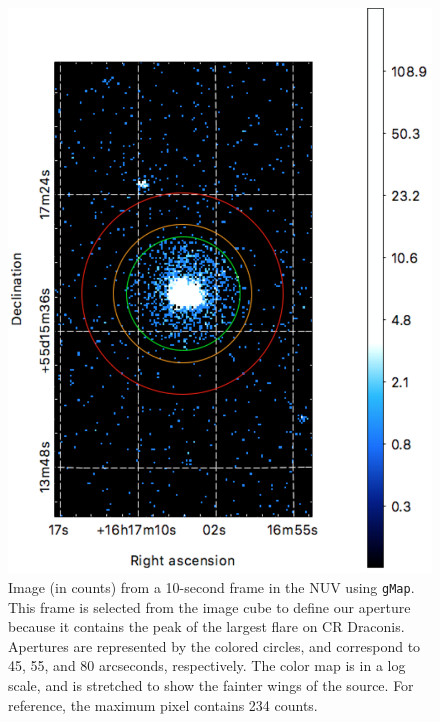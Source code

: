 \documentclass[iop]{emulateapj}
\begin{document}
\begin{figure}[h]
\includegraphics[scale=0.65]{Fig12.pdf}
\caption{Image (in counts) from a 10-second frame in the NUV using \texttt{gMap}.  This frame is selected from the image cube to define our aperture because it contains the peak of the largest flare on CR Draconis.  Apertures are represented by the colored circles, and correspond to 45, 55, and 80 arcseconds, respectively.  The color map is in a log scale, and is stretched to show the fainter wings of the source.  For reference, the maximum pixel contains 234 counts.\label{crdracoadd}}
\end{figure}
\end{document}
